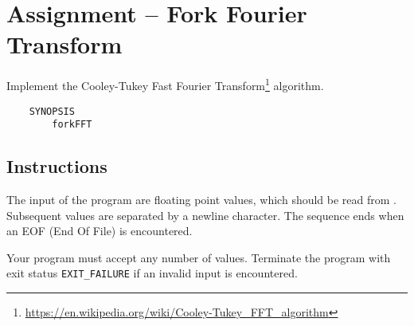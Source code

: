 
\usepackage{amsmath}
\usepackage{multicol}



\section*{Assignment -- Fork Fourier Transform}
Implement the Cooley-Tukey Fast Fourier Transform\footnote{\url{https://en.wikipedia.org/wiki/Cooley-Tukey\_FFT\_algorithm}} algorithm.
\begin{verbatim}
    SYNOPSIS
        forkFFT
\end{verbatim}

\subsection*{Instructions}
The input of the program are floating point values, which should be read from .
Subsequent values are separated by a newline character.
The sequence ends when an EOF (End Of File) is encountered.

Your program must accept any number of values.
Terminate the program with exit status \verb|EXIT_FAILURE|
if an invalid input is encountered.

